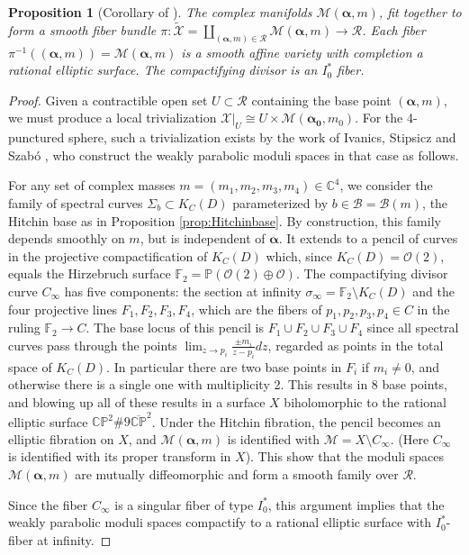 \documentclass[12pt,letterpaper,reqno]{amsart}
\def\mathbf#1{#1}%
\newtheorem{prop}[thm]{Proposition}
\theoremstyle{remark}
\theoremstyle{definition}
\numberwithin{thm}{section}
\numberwithin{equation}{section}
\numberwithin{figure}{section}
\newcommand{\cO}{\ensuremath{\mathcal O}}
\newcommand{\C}{\ensuremath{\mathbb C}}
\newcommand{\CP}{\ensuremath{\mathbb {CP}}}
\newcommand{\calB}{\mathcal B}
\newcommand{\calR}{\mathcal R}
\newcommand{\calM}{\mathcal M}
\newcommand{\tcalX}{\widetilde{\mathcal X}}
\newcommand{\calX}{\ensuremath{\mathcal X}}
\newcommand{\bsa}{\boldsymbol{\alpha}}
\newcommand{\bfm}{\mathbf{m}}
\begin{document}
\begin{prop}[Corollary of \cite{ISS19a, ISS19b}]\label{prop:fiberbundle} 
The complex manifolds $\calM(\bsa,\bfm)$, fit together to form a smooth fiber bundle 
$\pi: \tcalX = \coprod_{(\bsa,\bfm) \in \calR} \calM(\bsa, \bfm) \to \calR$.  Each fiber $\pi^{-1}( (\bsa, \bfm)) = \calM(\bsa,\bfm)$
is a smooth affine variety with completion a rational elliptic surface. The compactifying divisor is an $I_0^*$ fiber. 
\end{prop}
\begin{proof} 
Given a contractible open set $U \subset \mathcal{R}$ containing the base point $(\bsa,\bfm)$, we must produce a local trivialization $\calX|_U  \cong U \times
\calM(\boldsymbol{\alpha_0}, \mathbf{m_0})$. For the 4-punctured sphere, such a trivialization exists by the work of Ivanics, Stipsicz and 
Szab\'o \cite{ISS19a}, \cite{ISS19b} who construct the weakly parabolic moduli spaces in that case as follows.

For any set of complex masses $\bfm = (m_1, m_2, m_3, m_4) \in \C^4$, we consider the family of spectral curves $\Sigma_b \subset K_C(D)$
parameterized by $b \in \calB = \calB(\mathbf{m})$, the Hitchin base as in Proposition \ref{prop:Hitchinbase}. By construction, this family depends 
smoothly on $\bfm$, but is independent of $\bsa$. It extends to a pencil of curves in the projective compactification of $K_C(D)$ which, since 
$K_C(D) = \cO(2)$, equals the Hirzebruch surface $\mathbb{F}_2 = \mathbb{P}(\cO(2) \oplus \cO)$. The compactifying divisor curve $C_\infty$ has 
five components: the section at infinity $\sigma_\infty=\mathbb{F}_2 \setminus K_C(D)$ and the four projective lines $F_1, F_2, F_3, F_4$, 
which are the fibers of $p_1, p_2, p_3, p_4 \in C$ in the ruling $\mathbb{F}_2 \to C$. The base locus of this pencil is $F_1 \cup F_2 \cup F_3 \cup F_4$ 
since all spectral curves pass through the points $\lim_{z\to p_i}\frac{ \pm m_i}{z-p_i} dz$, regarded as points in the total space of $K_C(D)$. 
In particular there are two base points in $F_i$ if $m_i \neq 0$, and otherwise there is a single one with multiplicity 2.  This results in 8 base points,
and blowing up all of these results in a surface $X$ biholomorphic to the rational elliptic surface $\CP^2 \#9 \overline{\CP}^2$. Under the Hitchin
fibration, the pencil becomes an elliptic fibration on $X$, and $\calM(\bsa,\bfm)$ is identified with $\calM = X \setminus C_\infty$. (Here $C_\infty$ 
is identified with its proper transform in $X$). This show that the moduli spaces $\calM(\bsa,\bfm)$ are mutually diffeomorphic and form a smooth family 
over $\calR$. 

Since the fiber $C_\infty$ is a singular fiber of type $I_0^*$, this argument implies that the weakly parabolic moduli spaces compactify to a rational elliptic surface 
with $I_0^*$-fiber at infinity.
\end{proof}
\end{document}
